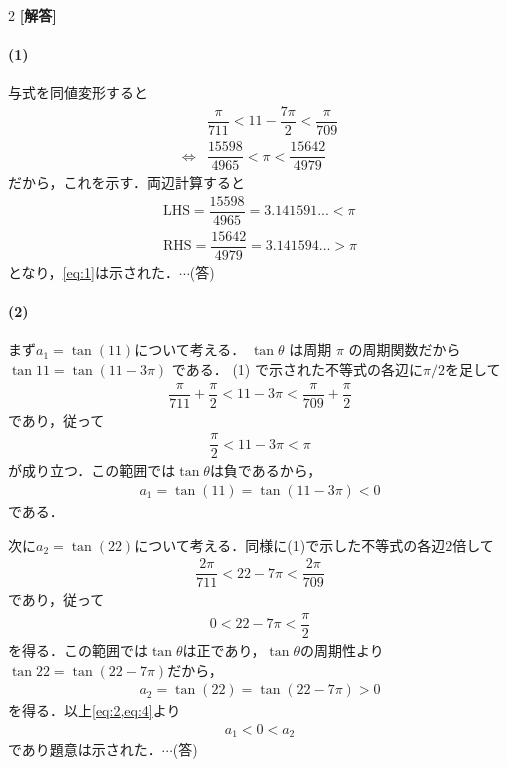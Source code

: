 \documentclass[../../main.tex]{subfiles}
\begin{document}
\setcounter{equation}{0}
\setcounter{figure}{0}
\setcounter{table}{0}
\begin{oframed}
  
\end{oframed}
\setlength{\columnseprule}{0.4pt}
\begin{multicols}{2}
  {\bf [解答]}

  \paragraph{(1)}

  与式を同値変形すると
  \begin{align}
    & \dfrac{\pi}{711} < 11 - \dfrac{7\pi}{2} < \dfrac{\pi}{709} \nonumber \\
    \iff
    & \dfrac{15598}{4965} < \pi < \dfrac{15642}{4979}\label{eq:1}
  \end{align}
  だから，これを示す．両辺計算すると
  \begin{align}
    \mathrm{LHS} = \dfrac{15598}{4965} = 3.141591... < \pi \\
    \mathrm{RHS} = \dfrac{15642}{4979} = 3.141594... > \pi
  \end{align}
  となり，\cref{eq:1}は示された．$\cdots$(答)

  \paragraph{(2)}
  まず$a_1=\tan(11)$について考える．
  $\tan \theta$ は周期 $\pi$ の周期関数だから $\tan 11 = \tan (11-3\pi)$ である．
  (1) で示された不等式の各辺に$\pi/2$を足して
  \begin{align}
    \dfrac{\pi}{711} + \dfrac{\pi}{2} < 11 - 3\pi < \dfrac{\pi}{709} + \dfrac{\pi}{2}
  \end{align}
  であり，従って
  \begin{align}
    \dfrac{\pi}{2} < 11 - 3\pi < \pi
  \end{align}
  が成り立つ．この範囲では$\tan\theta$は負であるから，
  \begin{align}
    a_1 = \tan(11) = \tan\left(11-3\pi\right) < 0 \label{eq:2}
  \end{align}
  である．

  次に$a_2=\tan(22)$について考える．同様に(1)で示した不等式の各辺$2$倍して
  \begin{align}
    \dfrac{2\pi}{711} < 22 - 7\pi < \dfrac{2\pi}{709} \label{eq:3}
  \end{align}
  であり，従って
  \begin{align}
    0 < 22 - 7\pi < \dfrac{\pi}{2}
  \end{align}
  を得る．この範囲では$\tan\theta$は正であり，$\tan\theta$の周期性より$\tan 22 = \tan (22-7\pi)$だから，
  \begin{align}
    a_2 = \tan(22) = \tan\left(22-7\pi\right) > 0 \label{eq:4}
  \end{align}
  を得る．以上\cref{eq:2,eq:4}より
  \begin{align}
    a_1 < 0 < a_2
  \end{align}
  であり題意は示された．$\cdots$(答)


\end{multicols}
\end{document}
